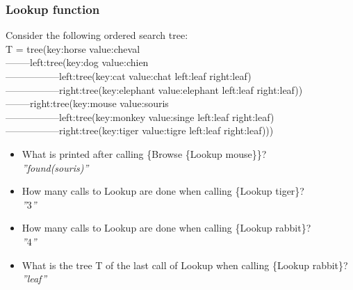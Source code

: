 \documentclass[fr,license=none]{../../../eplsummary}
\begin{document}
			\subsubsection*{Lookup function}
				Consider the following ordered search tree:\\
				T = tree(key:horse value:cheval\\
				--------left:tree(key:dog value:chien\\
				-----------------left:tree(key:cat value:chat left:leaf right:leaf)\\
				-----------------right:tree(key:elephant value:elephant left:leaf right:leaf))\\
				--------right:tree(key:mouse value:souris\\
				-----------------left:tree(key:monkey value:singe left:leaf right:leaf)\\
				-----------------right:tree(key:tiger value:tigre left:leaf right:leaf)))
				\begin{itemize}
					\item What is printed after calling \{Browse \{Lookup mouse\}\}?\\
						\textit{''found(souris)''}
					\item How many calls to Lookup are done when calling \{Lookup tiger\}?\\
						\textit{''$3$''}
					\item How many calls to Lookup are done when calling \{Lookup rabbit\}? \\
						\textit{''$4$''}
					\item What is the tree T of the last call of Lookup when calling \{Lookup rabbit\}?\\
						\textit{''leaf''}
				\end{itemize}
\end{document}
